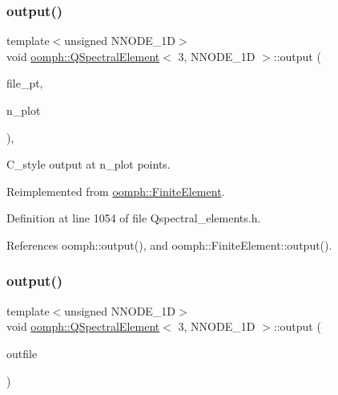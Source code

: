 \subsubsection{\texorpdfstring{output()}{output()}\hspace{0.1cm}{\footnotesize\ttfamily [2/4]}}
{\footnotesize\ttfamily template$<$unsigned N\+N\+O\+D\+E\+\_\+1D$>$ \\
void \hyperlink{classoomph_1_1QSpectralElement}{oomph\+::\+Q\+Spectral\+Element}$<$ 3, N\+N\+O\+D\+E\+\_\+1D $>$\+::output (\begin{DoxyParamCaption}\item[{F\+I\+LE $\ast$}]{file\+\_\+pt,  }\item[{const unsigned \&}]{n\+\_\+plot }\end{DoxyParamCaption})\hspace{0.3cm}{\ttfamily [inline]}, {\ttfamily [virtual]}}



C\+\_\+style output at n\+\_\+plot points. 



Reimplemented from \hyperlink{classoomph_1_1FiniteElement_adfaee690bb0608f03320eeb9d110d48c}{oomph\+::\+Finite\+Element}.



Definition at line 1054 of file Qspectral\+\_\+elements.\+h.



References oomph\+::output(), and oomph\+::\+Finite\+Element\+::output().

\mbox{\label{classoomph_1_1QSpectralElement_3_013_00_01NNODE__1D_01_4_a79244f5a472683a5596cbc109051bca9}} 
\subsubsection{\texorpdfstring{output()}{output()}\hspace{0.1cm}{\footnotesize\ttfamily [3/4]}}
{\footnotesize\ttfamily template$<$unsigned N\+N\+O\+D\+E\+\_\+1D$>$ \\
void \hyperlink{classoomph_1_1QSpectralElement}{oomph\+::\+Q\+Spectral\+Element}$<$ 3, N\+N\+O\+D\+E\+\_\+1D $>$\+::output (\begin{DoxyParamCaption}\item[{std\+::ostream \&}]{outfile }\end{DoxyParamCaption})\hspace{0.3cm}{\ttfamily [virtual]}}



